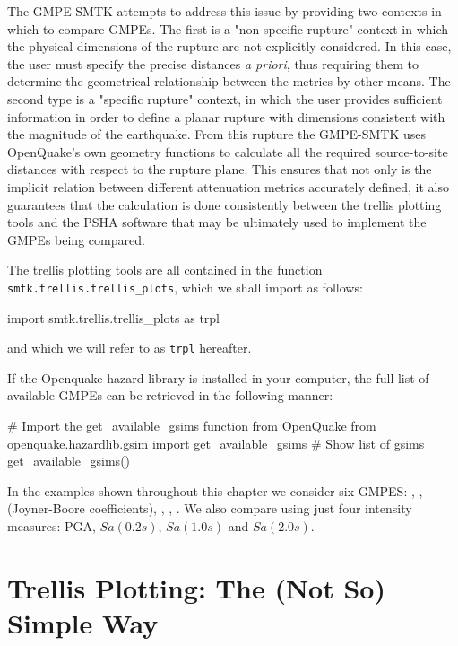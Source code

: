 The GMPE-SMTK attempts to address this issue by providing two contexts in which to compare GMPEs. The first is a "non-specific rupture" context in which the physical dimensions of the rupture are not explicitly considered. In this case, the user must specify the precise distances \emph{a priori}, thus requiring them to determine the geometrical relationship between the metrics by other means. The second type is a "specific rupture" context, in which the user provides sufficient information in order to define a planar rupture with dimensions consistent with the magnitude of the earthquake. From this rupture the GMPE-SMTK uses OpenQuake's own geometry functions to calculate all the required source-to-site distances with respect to the rupture plane. This ensures that not only is the implicit relation between different attenuation metrics accurately defined, it also guarantees that the calculation is done consistently between the trellis plotting tools and the PSHA software that may be ultimately used to implement the GMPEs being compared.

The trellis plotting tools are all contained in the function \verb=smtk.trellis.trellis_plots=, which we shall import as follows:

\begin{python}
import smtk.trellis.trellis_plots as trpl
\end{python}

\noindent and which we will refer to as \verb=trpl= hereafter.

If the Openquake-hazard library is installed in your computer, the full list of available GMPEs can be retrieved in the following manner:
\begin{python}[frame=single]
# Import the get_available_gsims function from OpenQuake
from openquake.hazardlib.gsim import get_available_gsims
# Show list of gsims
get_available_gsims()
\end{python}

In the examples shown throughout this chapter we consider six GMPES: \cite{AkkarBommer2010}, \cite{AkkarCagnan2010}, \cite{Akkar_etal2014} (Joyner-Boore coefficients), \cite{boore2008}, \cite{chiou2008}, \cite{Zhao2006}. We also compare using just four intensity measures: PGA, $Sa \left( {0.2s} \right)$, $Sa \left( {1.0s} \right)$ and $Sa \left( {2.0s} \right)$.


\section{Trellis Plotting: The (Not So) Simple Way}
\label{sec:basic_trellis}

